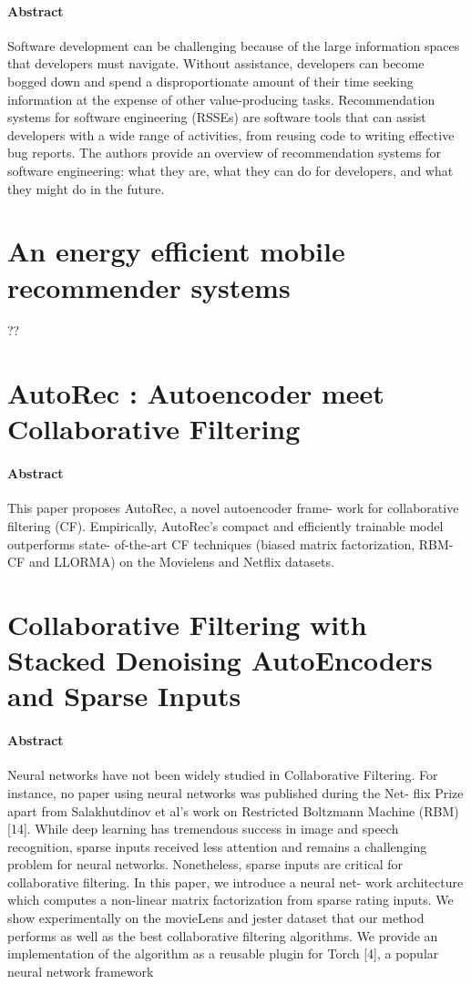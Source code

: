 \documentclass[oneside]{book}
\begin{document}
\paragraph{Abstract}
Software development can be challenging because of the large information spaces that developers must navigate. Without assistance, developers can become bogged down and spend a disproportionate amount of their time seeking information at the expense of other value-producing tasks. Recommendation systems for software engineering (RSSEs) are software tools that can assist developers with a wide range of activities, from reusing code to writing effective bug reports. The authors provide an overview of recommendation systems for software engineering: what they are, what they can do for developers, and what they might do in the future.
\section{An energy efficient mobile recommender systems}
??
\section{AutoRec : Autoencoder meet Collaborative Filtering}
\paragraph{Abstract}
This paper proposes AutoRec, a novel autoencoder frame-
work for collaborative filtering (CF). Empirically, AutoRec’s
compact and efficiently trainable model outperforms state-
of-the-art CF techniques (biased matrix factorization, RBM-
CF and LLORMA) on the Movielens and Netflix datasets.
\section{Collaborative Filtering with Stacked Denoising AutoEncoders and Sparse Inputs}
\paragraph{Abstract}
Neural networks have not been widely studied in Collaborative Filtering.
For instance, no paper using neural networks was published during the Net-
flix Prize apart from Salakhutdinov et al’s work on Restricted Boltzmann
Machine (RBM) [14].  While deep learning has tremendous success in image
and speech recognition, sparse inputs received less attention and remains
a challenging problem for neural networks.  Nonetheless, sparse inputs are
critical for collaborative filtering.  In this paper, we introduce a neural net-
work architecture which computes a non-linear matrix factorization from
sparse rating inputs.  We show experimentally on the movieLens and jester
dataset that our method performs as well as the best collaborative filtering
algorithms.  We provide an implementation of the algorithm as a reusable
plugin for Torch [4], a popular neural network framework
\end{document}
